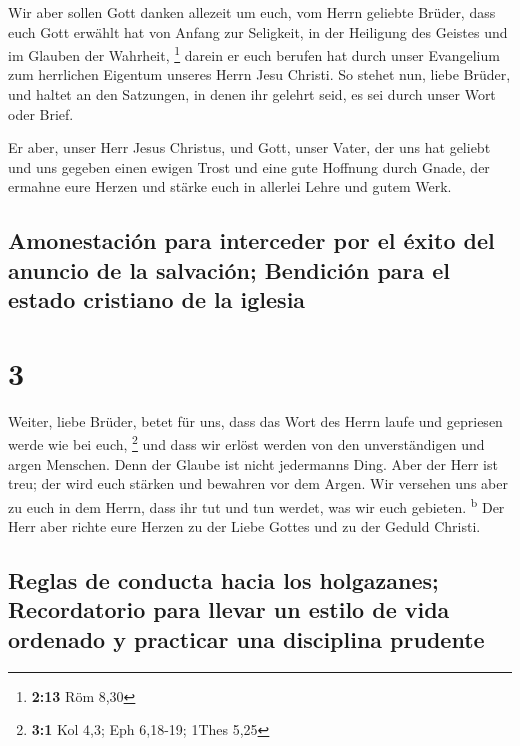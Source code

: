  Wir aber sollen Gott danken allezeit um euch, vom Herrn
geliebte Brüder, dass euch Gott erwählt hat von Anfang zur Seligkeit, in
der Heiligung des Geistes und im Glauben der Wahrheit, \footnote{\textbf{2:13}
  Röm 8,30}  darein er euch berufen hat durch unser
Evangelium zum herrlichen Eigentum unseres Herrn Jesu Christi.
 So stehet nun, liebe Brüder, und haltet an den
Satzungen, in denen ihr gelehrt seid, es sei durch unser Wort oder
Brief.

 Er aber, unser Herr Jesus Christus, und Gott, unser
Vater, der uns hat geliebt und uns gegeben einen ewigen Trost und eine
gute Hoffnung durch Gnade,  der ermahne eure Herzen und
stärke euch in allerlei Lehre und gutem Werk.

\hypertarget{amonestaciuxf3n-para-interceder-por-el-uxe9xito-del-anuncio-de-la-salvaciuxf3n-bendiciuxf3n-para-el-estado-cristiano-de-la-iglesia}{%
\subsection{Amonestación para interceder por el éxito del anuncio de la
salvación; Bendición para el estado cristiano de la
iglesia}\label{amonestaciuxf3n-para-interceder-por-el-uxe9xito-del-anuncio-de-la-salvaciuxf3n-bendiciuxf3n-para-el-estado-cristiano-de-la-iglesia}}

\hypertarget{section-2}{%
\section{3}\label{section-2}}

 Weiter, liebe Brüder, betet für uns, dass das Wort des
Herrn laufe und gepriesen werde wie bei euch, \footnote{\textbf{3:1} Kol
  4,3; Eph 6,18-19; 1Thes 5,25}  und dass wir erlöst
werden von den unverständigen und argen Menschen. Denn der Glaube ist
nicht jedermanns Ding.  Aber der Herr ist treu; der wird
euch stärken und bewahren vor dem Argen.  Wir versehen uns
aber zu euch in dem Herrn, dass ihr tut und tun werdet, was wir euch
gebieten. \textsuperscript{b}  Der Herr aber richte eure
Herzen zu der Liebe Gottes und zu der Geduld Christi.

\hypertarget{reglas-de-conducta-hacia-los-holgazanes-recordatorio-para-llevar-un-estilo-de-vida-ordenado-y-practicar-una-disciplina-prudente}{%
\subsection{Reglas de conducta hacia los holgazanes; Recordatorio para
llevar un estilo de vida ordenado y practicar una disciplina
prudente}\label{reglas-de-conducta-hacia-los-holgazanes-recordatorio-para-llevar-un-estilo-de-vida-ordenado-y-practicar-una-disciplina-prudente}}

